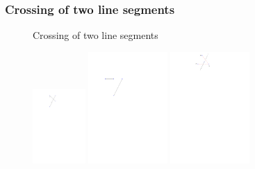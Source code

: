 \subsubsection{Crossing of two line segments}
\begin{figure}[H]
	\caption{Crossing of two line segments}
		\includegraphics[width=2cm]{figures/crosses.pdf}
		\caption{}
		\label{fig:crosses_a}
	\endminipage\hfill
		\includegraphics[width=3cm]{figures/crosses1.pdf}
		\caption{}
		\label{fig:crosses_b}
	\endminipage\hfill
		\includegraphics[width=3cm]{figures/crosses2.pdf}
		\caption{}
		\label{fig:crosses_c}
		\endminipage\hfill
\end{figure}

